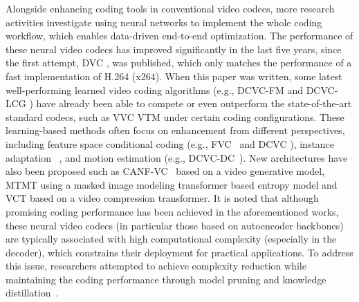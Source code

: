 \documentclass[11pt,a4paper]{article}
\begin{document}
Alongside enhancing coding tools in conventional video codecs, more research activities investigate using neural networks to implement the whole coding workflow, which enables data-driven end-to-end optimization. The performance of these neural video codecs has improved significantly in the last five years, since the first attempt, DVC \cite{lu2019dvc}, was published, which only matches the performance of a fast implementation of H.264 (x264). When this paper was written, some latest well-performing learned video coding algorithms (e.g., DCVC-FM \cite{li2024neural} and DCVC-LCG \cite{Qi2024longterm}) have already been able to compete or even outperform the state-of-the-art standard codecs, such as VVC VTM under certain coding configurations. These learning-based methods often focus on enhancement from different perspectives, including feature space conditional coding (e.g., FVC~\cite{hu2021fvc} and DCVC \cite{li2021deep}), instance adaptation ~\cite{khani2021efficient,yang2024parameter}, and motion estimation (e.g., DCVC-DC~\cite{li2023neural}). New architectures have also been proposed such as CANF-VC~\cite{ho2022canf} based on a video generative model, MTMT \cite{xiang2022mimt} using a masked image modeling transformer based entropy model and VCT \cite{mentzer2022vct} based on a video compression transformer. It is noted that although promising coding performance has been achieved in the aforementioned works, these neural video codecs (in particular those based on autoencoder backbones) are typically associated with high computational complexity (especially in the decoder), which constrains their deployment for practical applications. To address this issue, researchers attempted to achieve complexity reduction while maintaining the coding performance through model pruning and knowledge distillation~\cite{guo2023evc,peng2024accelerating}. 
\end{document}
